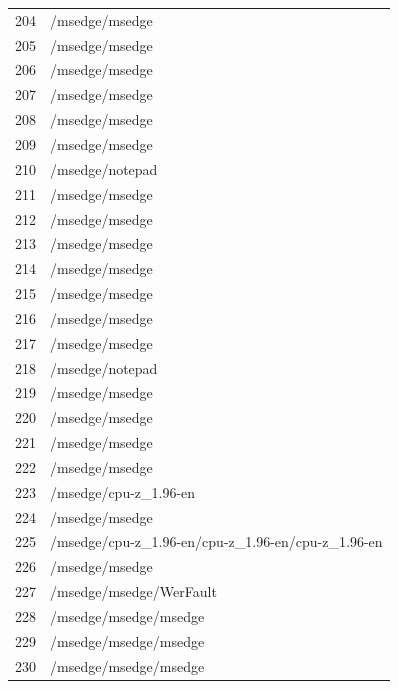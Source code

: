 \documentclass[a4paper,twoside,12pt]{book}
\begin{document}
\begin{appendices}
\begin{table}
\begin{tabular}{ll}
		204 &                                     /msedge/msedge \\
		205 &                                     /msedge/msedge \\
		206 &                                     /msedge/msedge \\
		207 &                                     /msedge/msedge \\
		208 &                                     /msedge/msedge \\
		209 &                                     /msedge/msedge \\
		210 &                                    /msedge/notepad \\
		211 &                                     /msedge/msedge \\
		212 &                                     /msedge/msedge \\
		213 &                                     /msedge/msedge \\
		214 &                                     /msedge/msedge \\
		215 &                                     /msedge/msedge \\
		216 &                                     /msedge/msedge \\
		217 &                                     /msedge/msedge \\
		218 &                                    /msedge/notepad \\
		219 &                                     /msedge/msedge \\
		220 &                                     /msedge/msedge \\
		221 &                                     /msedge/msedge \\
		222 &                                     /msedge/msedge \\
		223 &                              /msedge/cpu-z\_1.96-en \\
		224 &                                     /msedge/msedge \\
		225 &  /msedge/cpu-z\_1.96-en/cpu-z\_1.96-en/cpu-z\_1.96-en \\
		226 &                                     /msedge/msedge \\
		227 &                            /msedge/msedge/WerFault \\
		228 &                              /msedge/msedge/msedge \\
		229 &                              /msedge/msedge/msedge \\
		230 &                              /msedge/msedge/msedge \\
		\bottomrule
	\end{tabular}
\end{table}



\end{appendices}
\end{document}
